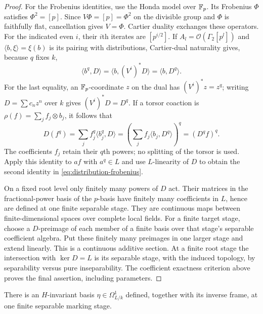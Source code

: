 \begin{proof}
For the Frobenius identities, use the Honda model over $\mathbb F_p$.
Its Frobenius $\Phi$ satisfies $\Phi^2=[p]$.  Since
$V\Phi=[p]=\Phi^2$ on the divisible group and $\Phi$ is faithfully
flat, cancellation gives $V=\Phi$.  Cartier duality exchanges these
operators.  For the indicated even $i$, their $i$th iterates are
$[p^{i/2}]$.  If $A_l=\mathcal O(\Gamma_2[p^l])$ and
$\langle b,\xi\rangle=\xi(b)$ is its pairing with distributions,
Cartier-dual naturality gives, because $q$ fixes $k$,
\[
 \langle b^q,D\rangle
 =\langle b,(V^i)^*D\rangle
 =\langle b,D^q\rangle.
\]
For the last equality, an $\mathbb F_p$-coordinate $z$ on the dual has
$(V^i)^*z=z^q$; writing $D=\sum c_nz^n$ over $k$ gives
$(V^i)^*D=D^q$.  If a torsor coaction is
$\rho(f)=\sum_j f_j\otimes b_j$, it follows that
\[
 D(f^q)=\sum_j f_j^q\langle b_j^q,D\rangle
       =\left(\sum_j f_j\langle b_j,D^q\rangle\right)^q
       =(D^qf)^q.
\]
The coefficients $f_j$ retain their $q$th powers; no splitting of the
torsor is used.  Apply this identity to $af$ with $a^q\in L$ and use
$L$-linearity of $D$ to obtain the second identity in
\eqref{eq:distribution-frobenius}.

On a fixed root level only finitely many powers of $D$ act.  Their
matrices in the fractional-power basis of the $p$-basis have finitely
many coefficients in $L$, hence are defined at one finite separable
stage.  They are continuous maps between finite-dimensional spaces
over complete local fields.  For a finite target stage, choose a
$D$-preimage of each member of a finite basis over that stage's
separable coefficient algebra.  Put these finitely many preimages
in one larger stage and extend linearly.  This is a continuous
additive section.  At a finite root stage the intersection with
$\ker D=L$ is its separable stage, with the induced topology, by
separability versus pure inseparability.  The coefficient exactness
criterion above proves the final assertion, including parameters.
\end{proof}

\begin{proposition}
\label{prop:invariant-differential}
There is an $H$-invariant basis
$\eta\in\Omega^1_{L/k}$ defined, together with its inverse frame,
at one finite separable marking stage.
\end{proposition}

